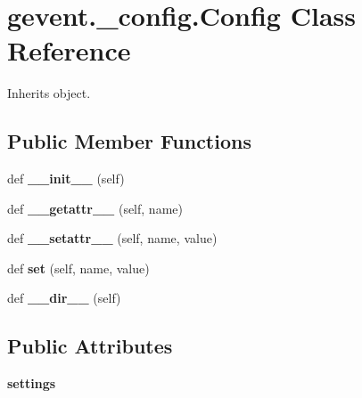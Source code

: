 \hypertarget{classgevent_1_1__config_1_1_config}{}\section{gevent.\+\_\+config.\+Config Class Reference}
\label{classgevent_1_1__config_1_1_config}


Inherits object.

\subsection*{Public Member Functions}
\begin{DoxyCompactItemize}
\item 
\mbox{\label{classgevent_1_1__config_1_1_config_ac09d2d10a12e804318d43906910f0ad7}} 
def {\bfseries \+\_\+\+\_\+init\+\_\+\+\_\+} (self)
\item 
\mbox{\label{classgevent_1_1__config_1_1_config_a87ce628183be9f8a3aeb6194389751fa}} 
def {\bfseries \+\_\+\+\_\+getattr\+\_\+\+\_\+} (self, name)
\item 
\mbox{\label{classgevent_1_1__config_1_1_config_af4887bd91cd7730bb0a2fb59b51cd595}} 
def {\bfseries \+\_\+\+\_\+setattr\+\_\+\+\_\+} (self, name, value)
\item 
\mbox{\label{classgevent_1_1__config_1_1_config_a1819b591b155c679effc899d13861b2c}} 
def {\bfseries set} (self, name, value)
\item 
\mbox{\label{classgevent_1_1__config_1_1_config_a2eae0dd8806ca7a2e64f2d2383514f1c}} 
def {\bfseries \+\_\+\+\_\+dir\+\_\+\+\_\+} (self)
\end{DoxyCompactItemize}
\subsection*{Public Attributes}
\begin{DoxyCompactItemize}
\item 
\mbox{\label{classgevent_1_1__config_1_1_config_a337bd48a609708840923a9b252284872}} 
{\bfseries settings}
\end{DoxyCompactItemize}


